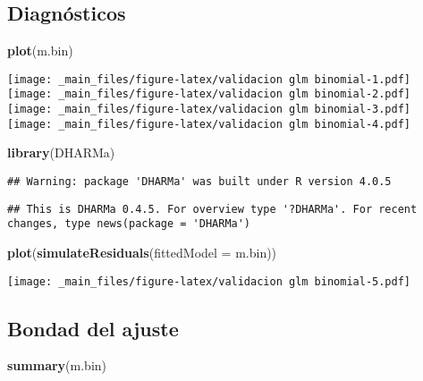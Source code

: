\documentclass[
]{book}
\newenvironment{Shaded}{\begin{snugshade}}{\end{snugshade}}
\newcommand{\DataTypeTok}[1]{\textcolor[rgb]{0.13,0.29,0.53}{#1}}
\newcommand{\KeywordTok}[1]{\textcolor[rgb]{0.13,0.29,0.53}{\textbf{#1}}}
\newcommand{\NormalTok}[1]{#1}
\begin{document}
\hypertarget{diagnuxf3sticos}{%
\subsection{Diagnósticos}\label{diagnuxf3sticos}}

\begin{Shaded}
\begin{Highlighting}[]
\KeywordTok{plot}\NormalTok{(m.bin)}
\end{Highlighting}
\end{Shaded}

\texttt{[image: \_main\_files/figure-latex/validacion glm binomial-1.pdf]} \texttt{[image: \_main\_files/figure-latex/validacion glm binomial-2.pdf]} \texttt{[image: \_main\_files/figure-latex/validacion glm binomial-3.pdf]} \texttt{[image: \_main\_files/figure-latex/validacion glm binomial-4.pdf]}

\begin{Shaded}
\begin{Highlighting}[]
\KeywordTok{library}\NormalTok{(DHARMa)}
\end{Highlighting}
\end{Shaded}

\begin{verbatim}
## Warning: package 'DHARMa' was built under R version 4.0.5
\end{verbatim}

\begin{verbatim}
## This is DHARMa 0.4.5. For overview type '?DHARMa'. For recent changes, type news(package = 'DHARMa')
\end{verbatim}

\begin{Shaded}
\begin{Highlighting}[]
\KeywordTok{plot}\NormalTok{(}\KeywordTok{simulateResiduals}\NormalTok{(}\DataTypeTok{fittedModel =}\NormalTok{ m.bin))}
\end{Highlighting}
\end{Shaded}

\texttt{[image: \_main\_files/figure-latex/validacion glm binomial-5.pdf]}

\hypertarget{bondad-del-ajuste}{%
\subsection{Bondad del ajuste}\label{bondad-del-ajuste}}

\begin{Shaded}
\begin{Highlighting}[]
\KeywordTok{summary}\NormalTok{(m.bin)}
\end{Highlighting}
\end{Shaded}
\end{document}
